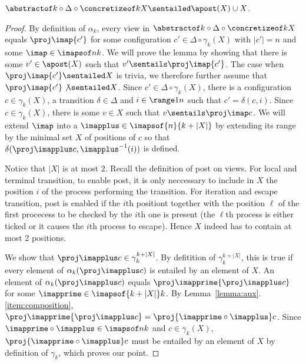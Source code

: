 \begin{lemma}
$\abstractof k\circ\Delta\circ\concretizeof k X \sentailed \apost(X) \cup X$.
\end{lemma}

\begin{proof}
By definition of $\alpha_k$, every view in $\abstractof k \circ \Delta \circ \concretizeof k X$ equals $\proj \imap {c'}$ for some configuration $c'\in \Delta \circ \gamma_k(X)$ with $|c'|=n$ and some $\imap\in \imapsof n {k}$.
We will prove the lemma by showing that there is some $v'\in \apost (X)$ 
such that $v'\sentails \proj \imap {c'}$. The case when $\proj \imap {c'}\sentailed X$ is trivia, we therefore further assume that $\proj \imap {c'}\not\sentailed X$.
Since $c'\in\Delta\circ\gamma_k(X)$, there is a configuration $c\in\gamma_k(X)$,
a transition $\delta\in\Delta$ and $i\in\range 1 {n}$ such that $c' = \delta(c,i)$.
Since $c\in\gamma_k(X)$, there is some $v\in X$ such that $v\sentails \proj \imap c$. 
We will extend $\imap$ into a $\imapplus\in \imapsof {n} {k+|X|}$ by extending its range by the minimal set $X$ of positions of $c$ so that $\delta(\proj \imapplus c, \imapplus^{-1}(i))$ is defined. 

Notice that $|X|$ is at most $2$. Recall the definition of post on views. For local and terminal transition, to enable post, it is only neccessary to include in $X$ the position $i$ of the process performing the transition. For iteration and escape transition, post is enabled if the $i$th positiont together with the position $\ell$ of the first procecess to be checked by the $i$th one is present (the $\ell$th process is either ticked or it causes the $i$th process to escape). Hence $X$ indeed has to contain at most 2 positions.

We show that $\proj \imapplus c \in \gamma_{k}^{k+|X|}$.
By defitition of $\gamma_k^{k+|X|}$, this is true if every element of $\alpha_k(\proj \imapplus c)$ is entailed by an element of $X$.
An element of $\alpha_k(\proj \imapplus c)$ equals $\proj \imapprime {\proj \imapplus c}$ for some $\imapprime \in \imapsof {k+|X|} k$. 
By Lemma~\ref{lemma:aux}.\ref{item:composition}, $\proj \imapprime {\proj \imapplus c} = \proj {\imapprime\circ\imapplus} c$. 
Since 
$\imapprime\circ\imapplus\in\imapsof n k$ and
$c\in \gamma_k(X)$,
$\proj {\imapprime\circ\imapplus} c$ must be entailed by an element of $X$ by definition of $\gamma_k$, which proves our point.


\end{proof}
